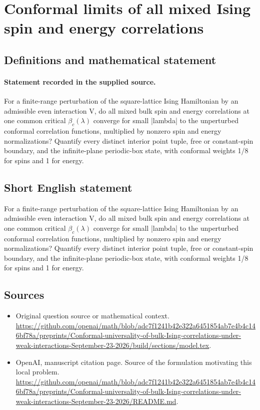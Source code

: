 \documentclass[11pt]{article}
\begin{document}
\section*{Conformal limits of all mixed Ising spin and energy correlations}\label{statement}
\subsection{Definitions and mathematical statement}
\paragraph{Statement recorded in the supplied source.}
For a finite-range perturbation of the square-lattice Ising Hamiltonian by an admissible even interaction V, do all mixed bulk spin and energy correlations at one common critical $\beta _c(\lambda )$ converge for small |lambda| to the unperturbed conformal correlation functions, multiplied by nonzero spin and energy normalizations? Quantify every distinct interior point tuple, free or constant-spin boundary, and the infinite-plane periodic-box state, with conformal weights 1/8 for spins and 1 for energy.
\subsection{Short English statement}
For a finite-range perturbation of the square-lattice Ising Hamiltonian by an admissible even interaction V, do all mixed bulk spin and energy correlations at one common critical $\beta _c(\lambda )$ converge for small |lambda| to the unperturbed conformal correlation functions, multiplied by nonzero spin and energy normalizations? Quantify every distinct interior point tuple, free or constant-spin boundary, and the infinite-plane periodic-box state, with conformal weights 1/8 for spins and 1 for energy.
\subsection{Sources}
\begin{itemize}
\item[S1] Original question source or mathematical context.
\url{https://github.com/openai/math/blob/adc7f1241b42e322a6451854ab7e4b4c146bf78a/preprints/Conformal-universality-of-bulk-Ising-correlations-under-weak-interactions-September-23-2026/build/sections/model.tex}.
\item[S2] OpenAI, manuscript citation page. Source of the formulation motivating this local problem.
\url{https://github.com/openai/math/blob/adc7f1241b42e322a6451854ab7e4b4c146bf78a/preprints/Conformal-universality-of-bulk-Ising-correlations-under-weak-interactions-September-23-2026/README.md}.
\end{itemize}
\end{document}
